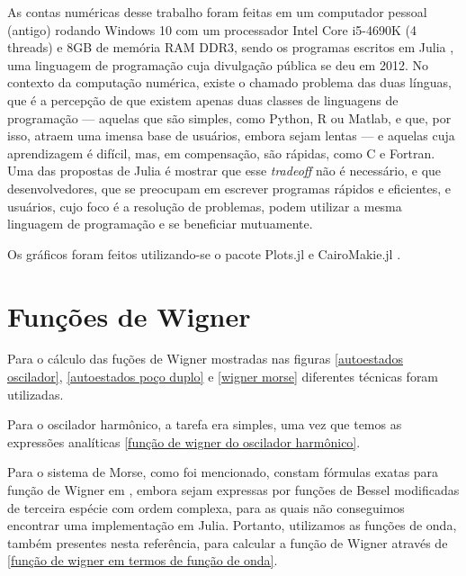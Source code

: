 \documentclass[
	12pt,
	oneside,			%
	a4paper,			%
	english,			%
	brazil				%
	]{abntex2}
\theoremstyle{definition}
\begin{document}
\begin{apendicesenv}
As contas numéricas desse trabalho foram feitas em um computador pessoal (antigo) rodando Windows 10 com um processador Intel Core i5-4690K (4 threads) e 8GB de memória RAM DDR3, sendo os programas escritos em Julia \cite{Julia-2017}, uma linguagem de programação cuja divulgação pública se deu em 2012. No contexto da computação numérica, existe o chamado problema das duas línguas, que é a percepção de que existem apenas duas classes de linguagens de programação — aquelas que são simples, como Python, R ou Matlab, e que, por isso, atraem uma imensa base de usuários, embora sejam lentas — e aquelas cuja aprendizagem é difícil, mas, em compensação, são rápidas, como C e Fortran. Uma das propostas de Julia é mostrar que esse \textit{tradeoff} não é necessário, e que desenvolvedores, que se preocupam em escrever programas rápidos e eficientes, e usuários, cujo foco é a resolução de problemas, podem utilizar a mesma linguagem de programação e se beneficiar mutuamente.

Os gráficos foram feitos utilizando-se o pacote Plots.jl \cite{https://doi.org/10.48550/arxiv.2204.08775} e CairoMakie.jl \cite{DanischKrumbiegel2021}.

\section{Funções de Wigner}

Para o cálculo das fuções de Wigner mostradas nas figuras \ref{autoestados oscilador}, \ref{autoestados poço duplo} e \ref{wigner morse} diferentes técnicas foram utilizadas.

Para o oscilador harmônico, a tarefa era simples, uma vez que temos as expressões analíticas \eqref{função de wigner do oscilador harmônico}. 

Para o sistema de Morse, como foi mencionado, constam fórmulas exatas para função de Wigner em \cite{dahl1988morse}, embora sejam expressas por funções de Bessel modificadas de terceira espécie com ordem complexa, para as quais não conseguimos encontrar uma implementação em Julia. Portanto, utilizamos as funções de onda, também presentes nesta referência, para calcular a função de Wigner através de \eqref{função de wigner em termos de função de onda}. 


\end{apendicesenv}
\end{document}
